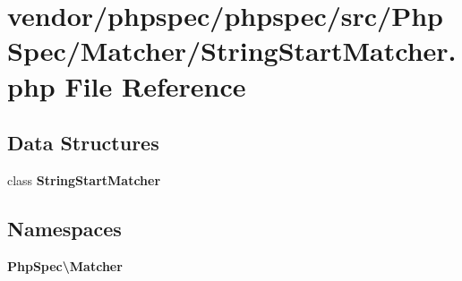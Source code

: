 \section{vendor/phpspec/phpspec/src/\+Php\+Spec/\+Matcher/\+String\+Start\+Matcher.php File Reference}
\label{_string_start_matcher_8php}
\subsection*{Data Structures}
\begin{DoxyCompactItemize}
\item 
class {\bf String\+Start\+Matcher}
\end{DoxyCompactItemize}
\subsection*{Namespaces}
\begin{DoxyCompactItemize}
\item 
 {\bf Php\+Spec\textbackslash{}\+Matcher}
\end{DoxyCompactItemize}
